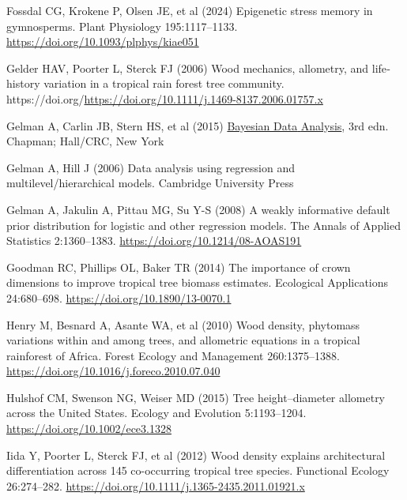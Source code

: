 \documentclass[
  12pt,
  letterpaper,
  DIV=11,
  numbers=noendperiod]{scrartcl}
\newlength{\cslhangindent}
\newlength{\cslentryspacingunit} %
\newenvironment{CSLReferences}[2] %
 {%
  \setlength{\parindent}{0pt}
  \ifodd #1
  \let\oldpar\par
  \def\par{\hangindent=\cslhangindent\oldpar}
  \fi
  \setlength{\parskip}{#2\cslentryspacingunit}
 }%
 {}
\begin{document}
\begin{CSLReferences}{1}{0}
\leavevmode{}%
Fossdal CG, Krokene P, Olsen JE, et al (2024) Epigenetic stress memory
in gymnosperms. Plant Physiology 195:1117--1133.
\url{https://doi.org/10.1093/plphys/kiae051}

\leavevmode{}%
Gelder HAV, Poorter L, Sterck FJ (2006) Wood mechanics, allometry, and
life‐history variation in a tropical rain forest tree community.
https://doi.org/\url{https://doi.org/10.1111/j.1469-8137.2006.01757.x}

\leavevmode{}%
Gelman A, Carlin JB, Stern HS, et al (2015)
\href{https://doi.org/10.1201/b16018}{Bayesian {Data} {Analysis}}, 3rd
edn. Chapman; Hall/CRC, New York

\leavevmode{}%
Gelman A, Hill J (2006) Data analysis using regression and
multilevel/hierarchical models. Cambridge University Press

\leavevmode{}%
Gelman A, Jakulin A, Pittau MG, Su Y-S (2008) A weakly informative
default prior distribution for logistic and other regression models. The
Annals of Applied Statistics 2:1360--1383.
\url{https://doi.org/10.1214/08-AOAS191}

\leavevmode{}%
Goodman RC, Phillips OL, Baker TR (2014) The importance of crown
dimensions to improve tropical tree biomass estimates. Ecological
Applications 24:680--698. \url{https://doi.org/10.1890/13-0070.1}

\leavevmode{}%
Henry M, Besnard A, Asante WA, et al (2010) Wood density, phytomass
variations within and among trees, and allometric equations in a
tropical rainforest of {Africa}. Forest Ecology and Management
260:1375--1388. \url{https://doi.org/10.1016/j.foreco.2010.07.040}

\leavevmode{}%
Hulshof CM, Swenson NG, Weiser MD (2015) Tree height--diameter allometry
across the {United} {States}. Ecology and Evolution 5:1193--1204.
\url{https://doi.org/10.1002/ece3.1328}

\leavevmode{}%
Iida Y, Poorter L, Sterck FJ, et al (2012) Wood density explains
architectural differentiation across 145 co-occurring tropical tree
species. Functional Ecology 26:274--282.
\url{https://doi.org/10.1111/j.1365-2435.2011.01921.x}


\end{CSLReferences}
\end{document}
